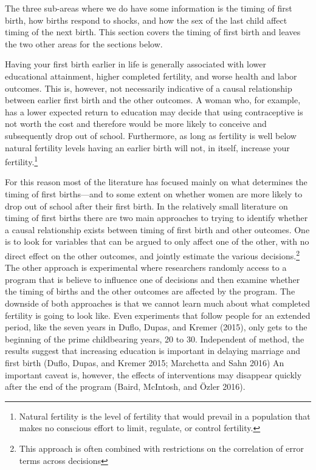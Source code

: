 \documentclass[]{article}
\begin{document}
The three sub-areas where we do have some information is the timing of first birth, how births respond to shocks, and how the sex of the last child affect timing of the next birth. This section covers the timing of first birth and leaves the two other areas for the sections below.

Having your first birth earlier in life is generally associated with lower educational attainment, higher completed fertility, and worse health and labor outcomes. This is, however, not necessarily indicative of a causal relationship between earlier first birth and the other outcomes. A woman who, for example, has a lower expected return to education may decide that using contraceptive is not worth the cost and therefore would be more likely to conceive and subsequently drop out of school. Furthermore, as long as fertility is well below natural fertility levels having an earlier birth will not, in itself, increase your fertility.\footnote{Natural fertility is the level of fertility that would prevail in a population that makes no conscious effort to limit, regulate, or control fertility.}

For this reason most of the literature has focused mainly on what determines the timing of first births---and to some extent on whether women are more likely to drop out of school after their first birth. In the relatively small literature on timing of first births there are two main approaches to trying to identify whether a causal relationship exists between timing of first birth and other outcomes. One is to look for variables that can be argued to only affect one of the other, with no direct effect on the other outcomes, and jointly estimate the various decisions.\footnote{This approach is often combined with restrictions on the correlation of error terms across decisions} The other approach is experimental where researchers randomly access to a program that is believe to influence one of decisions and then examine whether the timing of births and the other outcomes are affected by the program. The downside of both approaches is that we cannot learn much about what completed fertility is going to look like. Even experiments that follow people for an extended period, like the seven years in Duflo, Dupas, and Kremer (2015), only gets to the beginning of the prime childbearing years, 20 to 30. Independent of method, the results suggest that increasing education is important in delaying marriage and first birth (Duflo, Dupas, and Kremer 2015; Marchetta and Sahn 2016) An important caveat is, however, the effects of interventions may disappear quickly after the end of the program (Baird, McIntosh, and Özler 2016).
\end{document}
